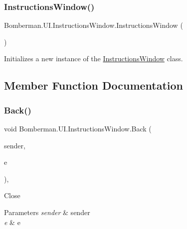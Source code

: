 \subsubsection{\texorpdfstring{InstructionsWindow()}{InstructionsWindow()}}
{\footnotesize\ttfamily Bomberman.\+U\+I.\+Instructions\+Window.\+Instructions\+Window (\begin{DoxyParamCaption}{ }\end{DoxyParamCaption})\hspace{0.3cm}{\ttfamily [inline]}}



Initializes a new instance of the \mbox{\hyperlink{class_bomberman_1_1_u_i_1_1_instructions_window}{Instructions\+Window}} class. 



\subsection{Member Function Documentation}
\mbox{\label{class_bomberman_1_1_u_i_1_1_instructions_window_a26a3f78a5537e22bc7a35cce5f37caa7}} 
\subsubsection{\texorpdfstring{Back()}{Back()}}
{\footnotesize\ttfamily void Bomberman.\+U\+I.\+Instructions\+Window.\+Back (\begin{DoxyParamCaption}\item[{object}]{sender,  }\item[{Routed\+Event\+Args}]{e }\end{DoxyParamCaption})\hspace{0.3cm}{\ttfamily [inline]}, {\ttfamily [private]}}



Close 


\begin{DoxyParams}{Parameters}
{\em sender} & sender\\
\hline
{\em e} & e\\
\hline
\end{DoxyParams}
\mbox{\label{class_bomberman_1_1_u_i_1_1_instructions_window_ad6e609958359984dc900ed1f68741efa}} 
